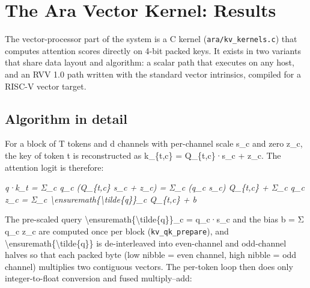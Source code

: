 \documentclass[12pt,a4paper]{report}
\begin{document}
\section{The Ara Vector Kernel: Results}\label{sec:10}
The vector-processor part of the system is a C kernel (\texttt{ara/\allowbreak{}kv\_\allowbreak{}\allowbreak{}kernels.\allowbreak{}c}) that computes attention scores directly on 4-bit packed keys. It exists in two variants that share data layout and algorithm: a scalar path that executes on any host, and an RVV 1.0 path written with the standard vector intrinsics, compiled for a RISC-V vector target.

\subsection{Algorithm in detail}\label{sec:10_1}
For a block of T tokens and d channels with per-channel scale s\_\allowbreak{}c and zero z\_\allowbreak{}c, the key of token t is reconstructed as k\_\allowbreak{}\{t,c\} = Q\_\allowbreak{}\{t,c\}·s\_\allowbreak{}c + z\_\allowbreak{}c. The attention logit is therefore:

\begin{center}\small\textit{q·k\_\allowbreak{}t = Σ\_\allowbreak{}c q\_\allowbreak{}c (Q\_\allowbreak{}\{t,c\} s\_\allowbreak{}c + z\_\allowbreak{}c) = Σ\_\allowbreak{}c (q\_\allowbreak{}c s\_\allowbreak{}c) Q\_\allowbreak{}\{t,c\} + Σ\_\allowbreak{}c q\_\allowbreak{}c z\_\allowbreak{}c = Σ\_\allowbreak{}c \textbackslash{}ensuremath\{\textbackslash{}tilde\{q\}\}\_\allowbreak{}c Q\_\allowbreak{}\{t,c\} + b}\end{center}
The pre-scaled query \textbackslash{}ensuremath\{\textbackslash{}tilde\{q\}\}\_\allowbreak{}c = q\_\allowbreak{}c·s\_\allowbreak{}c and the bias b = Σ q\_\allowbreak{}c z\_\allowbreak{}c are computed once per block (\texttt{kv\_\allowbreak{}\allowbreak{}qk\_\allowbreak{}\allowbreak{}prepare}), and \textbackslash{}ensuremath\{\textbackslash{}tilde\{q\}\} is de-interleaved into even-channel and odd-channel halves so that each packed byte (low nibble = even channel, high nibble = odd channel) multiplies two contiguous vectors. The per-token loop then does only integer-to-float conversion and fused multiply–add:
\end{document}
